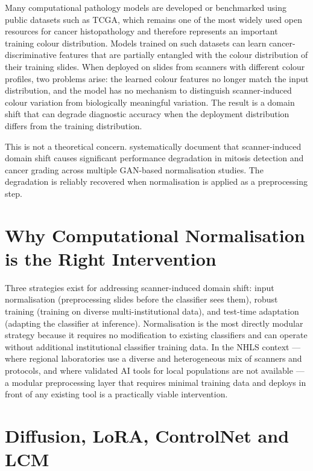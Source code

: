 \documentclass[a4paper,twoside,12pt]{report}
\begin{document}
Many computational pathology models are developed or benchmarked using public datasets such as TCGA, which remains one of the most widely used open resources for cancer histopathology and therefore represents an important training colour distribution. Models trained on such datasets can learn cancer-discriminative features that are partially entangled with the colour distribution of their training slides. When deployed on slides from scanners with different colour profiles, two problems arise: the learned colour features no longer match the input distribution, and the model has no mechanism to distinguish scanner-induced colour variation from biologically meaningful variation. The result is a domain shift that can degrade diagnostic accuracy when the deployment distribution differs from the training distribution.

This is not a theoretical concern. \citet{breen2024gans} systematically document that scanner-induced domain shift causes significant performance degradation in mitosis detection and cancer grading across multiple GAN-based normalisation studies. The degradation is reliably recovered when normalisation is applied as a preprocessing step.

\section{Why Computational Normalisation is the Right Intervention}

Three strategies exist for addressing scanner-induced domain shift: input normalisation (preprocessing slides before the classifier sees them), robust training (training on diverse multi-institutional data), and test-time adaptation (adapting the classifier at inference). Normalisation is the most directly modular strategy because it requires no modification to existing classifiers and can operate without additional institutional classifier training data. In the NHLS context --- where regional laboratories use a diverse and heterogeneous mix of scanners and protocols, and where validated AI tools for local populations are not available --- a modular preprocessing layer that requires minimal training data and deploys in front of any existing tool is a practically viable intervention.


\section{Diffusion, LoRA, ControlNet and LCM}
\end{document}

